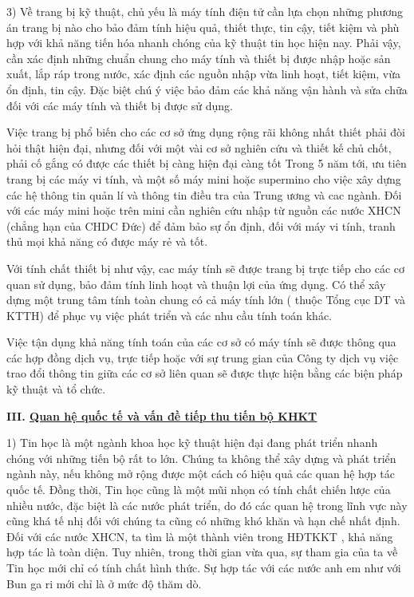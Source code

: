 \documentclass[11pt, a4paper, reqno, oneside]{book}
\begin{document}
3)	Về trang bị kỹ thuật, chủ yếu là máy tính điện tử cần lựa chọn những phương án trang bị nào cho bảo đảm tính hiệu quả, thiết thực, tin cậy, tiết kiệm và phù hợp với khả năng tiến hóa nhanh chóng của kỹ thuật tin học hiện nay. Phải vậy, cần xác định những chuẩn chung cho máy tính và thiết bị được nhập hoặc sản xuất, lắp ráp trong nước, xác định các nguồn nhập vừa linh hoạt, tiết kiệm, vừa ổn định, tin cậy. Đặc biệt chú ý việc bảo đảm các khả năng vận hành và sửa chữa đối với các máy tính và thiết bị được sử dụng.


Việc trang bị phổ biến cho các cơ sở ứng dụng rộng rãi không nhất thiết phải đòi hỏi thật hiện đại, nhưng đối với một vài cơ sở nghiên cứu và thiết kế chủ chốt, phải cố gắng có được các thiết bị càng hiện đại càng tốt
Trong 5 năm tới, ưu tiên trang bị các máy vi tính, và một số máy mini hoặc supermino cho việc xây dựng các hệ thông tin quản lí và thông tin điều tra của Trung ương và cac ngành. Đối với các máy mini hoặc trên mini cần nghiên cứu nhập từ nguồn các nước XHCN (chẳng hạn của CHDC Đức) để đảm bảo sự ổn định, đối với máy vi tính, tranh thủ mọi khả năng có được máy rẻ và tốt.


Với tính chất thiết bị như vậy, cac máy tính sẽ được trang bị trực tiếp cho các cơ quan sử dụng, bảo đảm tính linh hoạt và thuận lợi của ứng dụng. Có thể xây dựng một trung tâm tính toàn chung có cả máy tính lớn ( thuộc Tổng cục DT và KTTH) để phục vụ việc phát triển và các nhu cầu tính toán khác.


Việc tận dụng khả năng tính toán của các cơ sở có máy tính sẽ được thông qua các hợp đồng dịch vụ, trực tiếp hoặc với sự trung gian của Công ty dịch vụ việc trao đổi thông tin giữa các cơ sở liên quan sẽ được thực hiện bằng các biện pháp kỹ thuật và tổ chức.


\textbf{III. \underline{ Quan hệ quốc tế và vấn đề tiếp thu tiến bộ KHKT}}


1)	Tin học là một ngành khoa học kỹ thuật hiện đại đang phát triển nhanh chóng với những tiến bộ rất to lớn. Chúng ta không thể xây dựng và phát triển ngành này, nếu không mở rộng được một cách có hiệu quả các quan hệ hợp tác quốc tế. Đồng thời, Tin học cũng là một mũi nhọn có tính chất chiến lược của nhiều nước, đặc biệt là các nước phát triển, do đó các quan hệ trong lĩnh vực này cũng khá tế nhị đối với chúng ta cũng có những khó khăn và hạn chế nhất định.
Đối với các nước XHCN, ta tìm là một thành viên trong HĐTKKT , khả năng hợp tác là toàn diện. Tuy nhiên, trong thời gian vừa qua, sự tham gia của ta về Tin học mới chỉ có tính chất hình thức. Sự hợp tác với các nước anh em như với Bun ga ri mới chỉ là ở mức độ thăm dò.
\end{document}
